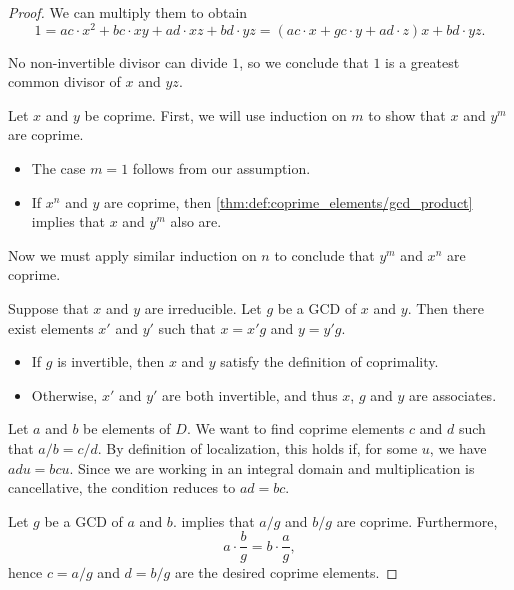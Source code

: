 \begin{proof}
  We can multiply them to obtain
  \begin{equation*}
    1 = ac \cdot x^2 + bc \cdot xy + ad \cdot xz + bd \cdot yz = (ac \cdot x + gc \cdot y + ad \cdot z) x + bd \cdot yz.
  \end{equation*}

  No non-invertible divisor can divide \( 1 \), so we conclude that \( 1 \) is a greatest common divisor of \( x \) and \( yz \).

   Let \( x \) and \( y \) be coprime. First, we will use induction on \( m \) to show that \( x \) and \( y^m \) are coprime.
  \begin{itemize}
    \item The case \( m = 1 \) follows from our assumption.
    \item If \( x^n \) and \( y \) are coprime, then \cref{thm:def:coprime_elements/gcd_product} implies that \( x \) and \( y^m \) also are.
  \end{itemize}

  Now we must apply similar induction on \( n \) to conclude that \( y^m \) and \( x^n \) are coprime.

   Suppose that \( x \) and \( y \) are irreducible. Let \( g \) be a GCD of \( x \) and \( y \). Then there exist elements \( x' \) and \( y' \) such that \( x = x'g \) and \( y = y'g \).

  \begin{itemize}
    \item If \( g \) is invertible, then \( x \) and \( y \) satisfy the definition of coprimality.
    \item Otherwise, \( x' \) and \( y' \) are both invertible, and thus \( x \), \( g \) and \( y \) are associates.
  \end{itemize}

   Let \( a \) and \( b \) be elements of \( D \). We want to find coprime elements \( c \) and \( d \) such that \( a / b = c / d \). By definition of localization, this holds if, for some \( u \), we have \( adu = bcu \). Since we are working in an integral domain and multiplication is cancellative, the condition reduces to \( ad = bc \).

  Let \( g \) be a GCD of \( a \) and \( b \).  implies that \( a / g \) and \( b / g \) are coprime. Furthermore,
  \begin{equation*}
    a \cdot \frac b g = b \cdot \frac a g,
  \end{equation*}
  hence \( c = a / g \) and \( d = b / g \) are the desired coprime elements.
\end{proof}

